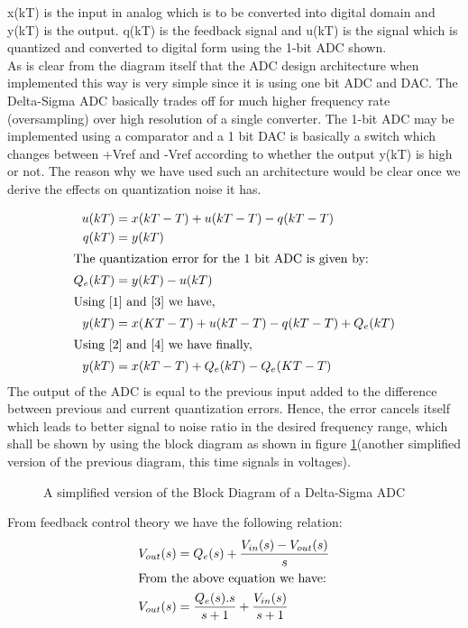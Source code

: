 \documentclass[colorlinks=true,pdfstartview=FitV,linkcolor=blue,
            citecolor=red,urlcolor=magenta]{ligodoc}
\begin{document}
x(kT) is the input in analog which is to be converted into digital domain and y(kT) is the output. q(kT) is the feedback signal and u(kT) is the signal which is quantized and converted to digital form using the 1-bit ADC shown.\\
As is clear from the diagram itself that the ADC design architecture when implemented this way is very simple since it is using one bit ADC and DAC. The Delta-Sigma ADC basically trades off for much higher frequency rate (oversampling) over high resolution of a single converter. The 1-bit ADC may be implemented using a comparator and a 1 bit DAC is basically a switch which changes between +Vref and -Vref according to whether the output y(kT) is high or not. The reason why we have used such an architecture would be clear once we derive the effects on quantization noise it has.

\begin{align}
u(kT)& = x(kT-T)+u(kT-T)-q(kT-T) \label{1}\\
q(kT)& = y(kT) \label{2}\\
\intertext{The quantization error for the 1 bit ADC is given by:}
Q_{e}(kT)& = y(kT)-u(kT) \label{3}\\
\intertext{Using \ref{1} and \ref{3} we have,}
y(kT)& =x(KT-T)+u(kT-T)-q(kT-T)+Q_{e}(kT) \label{4}\\
\intertext{Using \ref{2} and \ref{4} we have finally,}
y(kT)& =x(kT-T)+Q_{e}(kT)-Q_{e}(KT-T)
\end{align}
The output of the ADC is equal to the previous input added to the difference between previous and current quantization errors. Hence, the error cancels itself which leads to better signal to noise ratio in the desired frequency range, which shall be shown by using the block diagram as shown in figure \ref{simple}(another simplified version of the previous diagram, this time signals in voltages).
\begin{figure}[htbp]
 
  \centering
  
  \caption{A simplified version of the Block Diagram of a Delta-Sigma ADC}
 \label{simple}
\end{figure}
From feedback control theory we have the following relation:
\begin{align}
V_{out}(s)&=Q_{e}(s)+\frac{V_{in}(s)-V_{out}(s)}{s}\\
\intertext{From the above equation we have:}
V_{out}(s)&=\frac{Q_{e}(s).s}{s+1} + \frac{V_{in}(s)}{s+1}
\end{align}
\end{document}
